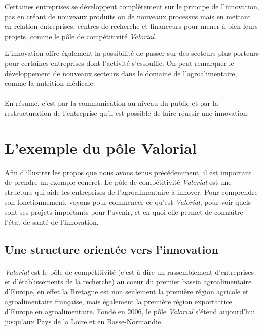 \documentclass[a4paper,12pt]{report}
\begin{document}
	Certaines entreprises se développent complètement sur le principe de l’innovation, pas en créant de nouveaux produits ou de nouveaux processus mais en mettant en relation entreprises, centres de recherche et financeurs pour mener à bien leurs projets, comme le pôle de compétitivité \textit{Valorial}.

	L’innovation offre également la possibilité de passer sur des secteurs plus porteurs pour certaines entreprises dont l’activité s'essouffle. On peut remarquer le développement de nouveaux secteurs dans le domaine de l’agroalimentaire, comme la nutrition médicale.
	
	\paragraph{}En résumé, c'est par la communication au niveau du public et par la restructuration de l'entreprise qu'il est possible de faire réussir une innovation.
			
	\section{L'exemple du pôle Valorial}
	
		Afin d'illustrer les propos que nous avons tenus précédemment, il est important de prendre un exemple concret. Le pôle de compétitivité \textit{Valorial} est une structure qui aide les entreprises de l'agroalimentaire à innover. Pour comprendre son fonctionnement, voyons pour commencer ce qu'est \textit{Valorial}, pour voir quels sont ses projets importants pour l'avenir, et en quoi elle permet de connaître l'état de santé de l'innovation.
		
		\subsection{Une structure orientée vers l'innovation}
			\paragraph{}\textit{Valorial} est le pôle de compétitivité (c’est-à-dire un rassemblement d’entreprises et d’établissements de la recherche) au coeur du premier bassin agroalimentaire d’Europe\cite{SiteValorial}, en effet la Bretagne est non seulement la première région agricole et agroalimentaire française, mais également la première région exportatrice d’Europe en agroalimentaire\cite{RennesAtalante}. Fondé en 2006, le pôle \textit{Valorial} s’étend aujourd’hui jusqu’aux Pays de la Loire et en Basse-Normandie.
\end{document}
